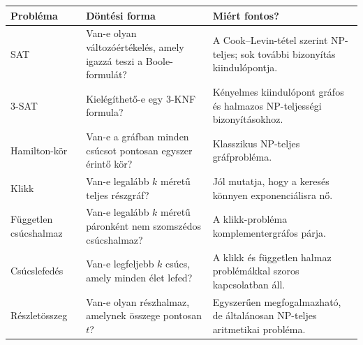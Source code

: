 \begin{tabularx}{\textwidth}{L{31mm}L{44mm}X}
\toprule
\textbf{Probléma} & \textbf{Döntési forma} & \textbf{Miért fontos?} \\
\midrule
SAT & Van-e olyan változóértékelés, amely igazzá teszi a Boole-formulát? & A Cook--Levin-tétel szerint NP-teljes; sok további bizonyítás kiindulópontja. \\
3-SAT & Kielégíthető-e egy 3-KNF formula? & Kényelmes kiindulópont gráfos és halmazos NP-teljességi bizonyításokhoz. \\
Hamilton-kör & Van-e a gráfban minden csúcsot pontosan egyszer érintő kör? & Klasszikus NP-teljes gráfprobléma. \\
Klikk & Van-e legalább $k$ méretű teljes részgráf? & Jól mutatja, hogy a keresés könnyen exponenciálisra nő. \\
Független csúcshalmaz & Van-e legalább $k$ méretű páronként nem szomszédos csúcshalmaz? & A klikk-probléma komplementergráfos párja. \\
Csúcslefedés & Van-e legfeljebb $k$ csúcs, amely minden élet lefed? & A klikk és független halmaz problémákkal szoros kapcsolatban áll. \\
Részletösszeg & Van-e olyan részhalmaz, amelynek összege pontosan $t$? & Egyszerűen megfogalmazható, de általánosan NP-teljes aritmetikai probléma. \\
\bottomrule
\end{tabularx}

